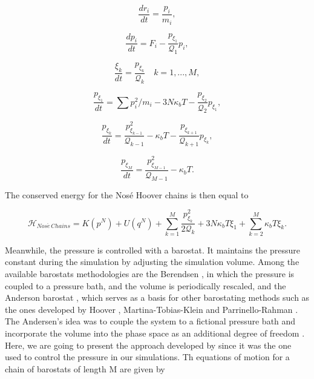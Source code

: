 \begin{equation}
\frac{dr_{i}}{dt} = \frac{p_i}{m_i},
\end{equation}

\begin{equation}
\frac{dp_{i}}{dt} = F_i  - \frac{p_{\xi _{1}}}{\mathcal{Q} _1} p_{i},
\end{equation}

\begin{equation}
\frac{\xi _{k}}{dt} = \frac{p_{\xi _k}}{\mathcal{Q} _{k}} \quad k = 1,...,M ,
\end{equation}

\begin{equation}
\frac{p_{\xi _1}}{dt} = {\sum p_{i}^{2}/m_{i} - 3N\kappa_{b}T} -  \frac{p_{\xi _{2}}}{\mathcal{Q} _2}p_{\xi _{1}},
\end{equation}

\begin{equation}
\frac{p_{\xi _k}}{dt} = \frac{p_{\xi _{k -1}}^{2}}{\mathcal{Q} _{k-1}} - \kappa_{b}T - \frac{p_{\xi _{k+1}}}{\mathcal{Q} _{k+1}}p_{\xi _{k}},
\end{equation}

\begin{equation}
\frac{p_{\xi _M}}{dt} = \frac{ p_{\xi _{M-1}}^{2}}{\mathcal{Q} _{M-1}} - \kappa_{b}T .
\end{equation}

The conserved energy for the Nos\'{e} Hoover chains is then equal to

\begin{equation}
\mathcal{H}_{Nos\acute{e} \, Chains} =  K(p^{N}) + U(q^{N})  + \sum_{k=1}^{M }\frac{p^{2}_{\xi _{k}}}{2\mathcal{Q} _{k}} + 3N\kappa_{b}T \xi _{1} + \sum_{k=2}^{M} \kappa_{b}T \xi _{k}.
\end{equation}

Meanwhile, the pressure is controlled with a barostat. It maintains the pressure constant during the simulation by adjusting the simulation volume. Among the available  barostats methodologies are the Berendsen \cite{doi:10.1063/1.448118}, in which the pressure is coupled to a pressure bath, and the volume is periodically rescaled, and the Anderson barostat \cite{1980JChPh722384A}, which serves as a basis for other barostating methods such as the ones developed by Hoover \cite{PhysRevA.31.1695}, Martina-Tobias-Klein \cite{doi:10.1063/1.467468} and Parrinello-Rahman \cite{doi:10.1063/1.328693}. The Andersen's idea was to couple the system to a fictional pressure bath and incorporate the volume into the phase space as an additional degree of freedom \cite{tuckerman}. Here, we are going to present the approach developed by \cite{doi:10.1063/1.467468} since it was the one used to control the pressure in our simulations. Th equations of motion for a chain of barostats of length M are given by  

